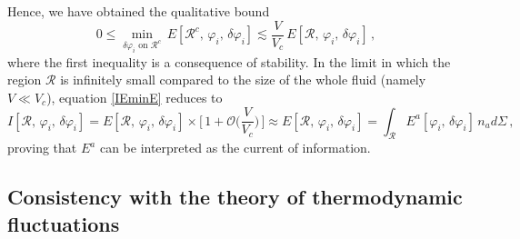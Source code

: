 \documentclass[aps,prl,reprint,nofootinbib]{revtex4-1}
\begin{document}
Hence, we have obtained the qualitative bound
\begin{equation}\label{ventisette}
0 \leq \min_{\delta \varphi_i \text{ on }\mathcal{R}^c} \, E[\mathcal{R}^c,\, \varphi_i, \, \delta \varphi_i] \lesssim \dfrac{V}{V_c} \, E[\mathcal{R},\, \varphi_i, \, \delta \varphi_i] \, ,
\end{equation}
where the first inequality is a consequence of stability. In the limit in which the region $\mathcal{R}$ is infinitely small compared to the size of the whole fluid (namely $V \ll V_c$), equation \eqref{IEminE} reduces to
\begin{equation}
I[\mathcal{R},\, \varphi_i, \, \delta \varphi_i] = E[\mathcal{R},\, \varphi_i, \, \delta \varphi_i] \times \bigg[ \, 1+\mathcal{O}\bigg(  \dfrac{V}{V_c} \bigg) \, \bigg] \approx E[\mathcal{R},\, \varphi_i, \, \delta \varphi_i]= \int_{\mathcal{R}} E^a[\varphi_i, \, \delta \varphi_i]  \, n_a d\Sigma \, ,
\end{equation}
proving that $E^a$ can be interpreted as the current of information. 


\subsection{Consistency with the theory of thermodynamic fluctuations}
\end{document}
